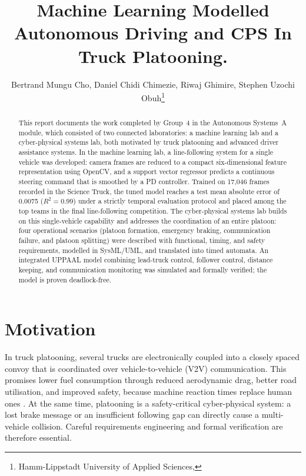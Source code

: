 \documentclass[english]{lni}
\begin{document}
\title[Autonomous Systems A Lab Final Report]{Machine Learning Modelled Autonomous Driving and CPS In Truck Platooning.}
\author[Bertrand Mungu Cho, Daniel Chidi Chimezie, Riwaj Ghimire, Stephen Uzochi Obuh]{Bertrand Mungu Cho, Daniel Chidi Chimezie, Riwaj Ghimire, Stephen Uzochi Obuh\footnote{Hamm-Lippstadt University of Applied Sciences, }}

\maketitle
\setcounter{tocdepth}{1}
\tableofcontents

\newpage

\begin{abstract}
This report documents the work completed by Group~4 in the Autonomous Systems~A module, which consisted of two connected laboratories: a machine learning lab and a cyber-physical systems lab, both motivated by truck platooning and advanced driver assistance systems. In the machine learning lab, a line-following system for a single vehicle was developed: camera frames are reduced to a compact six-dimensional feature representation using OpenCV, and a support vector regressor predicts a continuous steering command that is smoothed by a PD controller. Trained on 17{,}046 frames recorded in the Science Truck, the tuned model reaches a test mean absolute error of 0.0075 ($R^2 = 0.99$) under a strictly temporal evaluation protocol and placed among the top teams in the final line-following competition. The cyber-physical systems lab builds on this single-vehicle capability and addresses the coordination of an entire platoon: four operational scenarios (platoon formation, emergency braking, communication failure, and platoon splitting) were described with functional, timing, and safety requirements, modelled in SysML/UML, and translated into timed automata. An integrated UPPAAL model combining lead-truck control, follower control, distance keeping, and communication monitoring was simulated and formally verified; the model is proven deadlock-free.
\end{abstract}

\newpage

\section{Motivation}
In truck platooning, several trucks are electronically coupled into a closely spaced convoy that is coordinated over vehicle-to-vehicle (V2V) communication. This promises lower fuel consumption through reduced aerodynamic drag, better road utilisation, and improved safety, because machine reaction times replace human ones \cite{LBS22}. At the same time, platooning is a safety-critical cyber-physical system: a lost brake message or an insufficient following gap can directly cause a multi-vehicle collision. Careful requirements engineering and formal verification are therefore essential.
\end{document}
